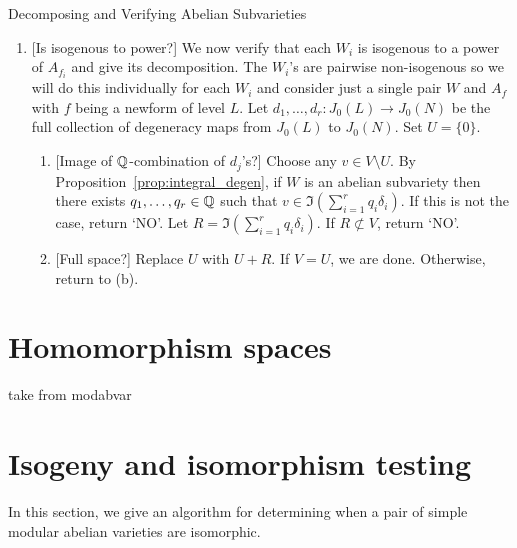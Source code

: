 \documentclass[11pt, proquest]{uwthesis}
\begin{document}
\begin{algorithm}{Decomposing and Verifying Abelian Subvarieties}
\begin{enumerate}
\begin{enumerate}
                    $k$ so let $S_{j,k}=\{f_k\}$ and $W_k=U_{j,k}$.
            \end{enumerate}
        \item{} [Is isogenous to power?]
            We now verify that each $W_i$ is isogenous to a power of $A_{f_i}$
            and give its decomposition. The $W_i$'s are pairwise non-isogenous
            so we will do this individually for each $W_i$ and consider just a
            single pair $W$ and $A_f$ with $f$ being a newform of level $L$.
            Let $d_1,\ldots,d_r:J_0(L)\to J_0(N)$ be the full collection of
            degeneracy maps from $J_0(L)$ to $J_0(N)$.  Set $U=\{0\}$.
            \begin{enumerate}
                \item{} [Image of $\mathbb{Q}$-combination of $d_j$'s?]
                    Choose any $v\in V\setminus U$. By
                    Proposition~\ref{prop:integral_degen}, if $W$ is an abelian
                    subvariety then there exists $q_1,\ldots,q_r\in \mathbb{Q}$
                    such that $v\in \Im \left(\sum_{i=1} ^r q_i
                    \delta_i\right)$. If this is not the case, return
                    `NO'. Let $R = \Im \left(\sum_{i=1} ^r q_i
                    \delta_i\right)$. If $R\not\subset V$, return `NO'.
                \item{} [Full space?]
                    Replace $U$ with $U+R$. If $V=U$, we are done. Otherwise,
                    return to (b).
            \end{enumerate}
    \end{enumerate}
\end{algorithm}


\section{Homomorphism spaces}

take from modabvar

\section{Isogeny and isomorphism testing}

In this section, we give an algorithm for determining when a pair of simple
modular abelian varieties are isomorphic.
\end{document}
